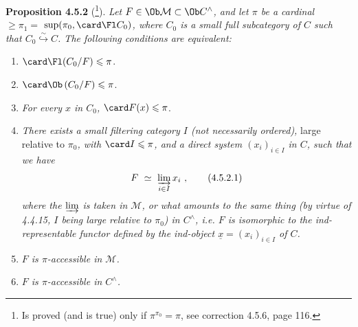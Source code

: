 \textbf{Proposition 4.5.2} (\footnote{Is proved (and is true) only if $\pi^{\pi_0} = \pi$, see correction 4.5.6, page 116.}). \textit{Let $F \in \Ob\mathcal{M} \subset \Ob C^{\wedge}$, and let $\pi$ be a cardinal $\geqslant \pi_1 =$} $\sup(\pi_0, \card\Fl C_0)$\textit{, where $C_0$ is a small full subcategory of $C$ such that $C_0 \overset{\sim}{\hookrightarrow} C$. The following conditions are equivalent:}
\begin{enumerate}[leftmargin=3em]
\item[\textit{a)}] $\card\Fl(C_0/F) \leqslant \pi$.
\item[\textit{a$'$)}] $\card\Ob\,(C_0/F) \leqslant \pi$.
\item[\textit{a$''$)}] \textit{For every $x$ in $C_0$,} $\card F(x) \leqslant \pi$.
\item[\textit{b)}] \textit{There exists a small filtering category $I$ (not necessarily ordered),} large relative to $\pi_0$\textit{, with} $\card I \leqslant \pi$\textit{, and a direct system $(x_i)_{i\in I}$ in $C$, such that we have}
\[
F \ \simeq\ \varinjlim_{i\in I} x_i\ ,
\tag*{(4.5.2.1)}
\]
\textit{where the $\varinjlim$ is taken in $\mathcal{M}$, or what amounts to the same thing (by virtue of 4.4.15, $I$ being large relative to $\pi_0$) in $C^{\wedge}$, i.e. $F$ is isomorphic to the ind-representable functor defined by the ind-object $\underline{x} = (x_i)_{i\in I}$ of $C$.}
\item[\textit{c)}] \textit{$F$ is $\pi$-accessible in $\mathcal{M}$.}
\item[\textit{c$'$)}] \textit{$F$ is $\pi$-accessible in $C^{\wedge}$.}
\end{enumerate}

